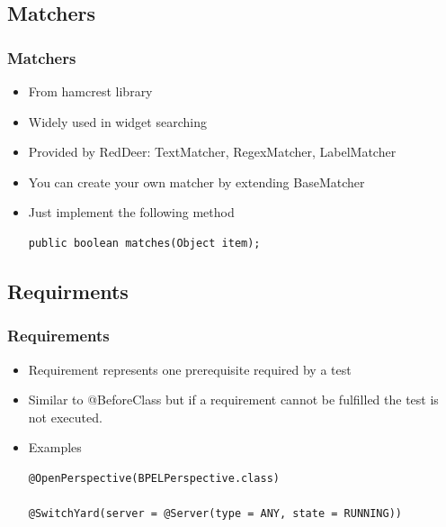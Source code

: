\documentclass{beamer}
\begin{document}
\subsection{Matchers}
\begin{frame}[fragile]
\frametitle{Matchers}
\begin{itemize}
\item From hamcrest library
\item Widely used in widget searching
\item Provided by RedDeer: TextMatcher, RegexMatcher, LabelMatcher
\item You can create your own matcher by extending BaseMatcher
\item Just implement the following method
\begin{lstlisting}
public boolean matches(Object item);
\end{lstlisting}
\end{itemize}
\end{frame}

\subsection{Requirments}
\begin{frame}[fragile]
\frametitle{Requirements}
\begin{itemize}
\item Requirement represents one prerequisite required by a test
\item Similar to @BeforeClass but if a requirement cannot be fulfilled the test is not executed.
\item Examples
\begin{lstlisting}
@OpenPerspective(BPELPerspective.class)

@SwitchYard(server = @Server(type = ANY, state = RUNNING))
\end{lstlisting}
\end{itemize}
\end{frame}
\end{document}

